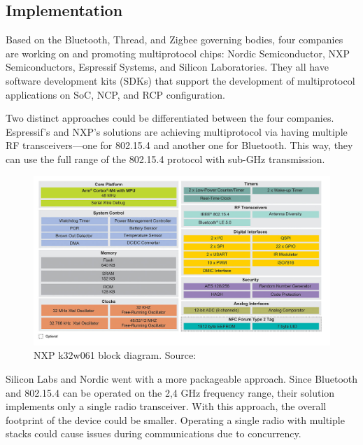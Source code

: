 \subsection{Implementation}
\label{sec:multi:imp}
Based on the Bluetooth, Thread, and Zigbee governing bodies\cite{bt_members:2023, csa_members:2023, thread_members:2023}, four companies are working on and promoting multiprotocol chips: Nordic Semiconductor, NXP Semiconductors, Espressif Systems, and Silicon Laboratories. They all have software development kits (SDKs) that support the development of multiprotocol applications on SoC, NCP, and RCP configuration.

Two distinct approaches could be differentiated between the four companies. Espressif's and NXP's solutions are achieving multiprotocol via having multiple RF transceivers—one for 802.15.4 and another one for Bluetooth. This way, they can use the full range of the 802.15.4 protocol with sub-GHz transmission.

\begin{figure}
    \centering
    \includegraphics[width=140mm, keepaspectratio]{figures/nxp_k32w061_41-block-dia.png}
    \caption{NXP k32w061 block diagram. Source: \cite{nxp}}
    \label{fig:mp:nxp-dia}
\end{figure}

Silicon Labs and Nordic went with a more packageable approach. Since Bluetooth and 802.15.4 can be operated on the 2,4 GHz frequency range, their solution implements only a single radio transceiver. With this approach, the overall footprint of the device could be smaller. Operating a single radio with multiple stacks could cause issues during communications due to concurrency.

